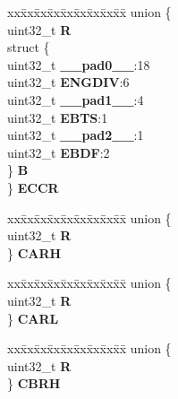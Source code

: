 \begin{DoxyCompactItemize}
\begin{tabbing}
\end{tabbing}\item 
\mbox{\label{structSIU__tag_ab62819545c38a07794ff44a516559b11}} 
\begin{tabbing}
xx\=xx\=xx\=xx\=xx\=xx\=xx\=xx\=xx\=\kill
union \{\\
\>uint32\_t {\bfseries R}\\
\>struct \{\\
\>\>uint32\_t {\bfseries \_\_pad0\_\_}:18\\
\>\>uint32\_t {\bfseries ENGDIV}:6\\
\>\>uint32\_t {\bfseries \_\_pad1\_\_}:4\\
\>\>uint32\_t {\bfseries EBTS}:1\\
\>\>uint32\_t {\bfseries \_\_pad2\_\_}:1\\
\>\>uint32\_t {\bfseries EBDF}:2\\
\>\} {\bfseries B}\\
\} {\bfseries ECCR}\\

\end{tabbing}\item 
\mbox{\label{structSIU__tag_a64fcdd83ff9c5bfd1331085664179384}} 
\begin{tabbing}
xx\=xx\=xx\=xx\=xx\=xx\=xx\=xx\=xx\=\kill
union \{\\
\>uint32\_t {\bfseries R}\\
\} {\bfseries CARH}\\

\end{tabbing}\item 
\mbox{\label{structSIU__tag_acd38a55ebe96d07c4ccf4faa7d1f1c1f}} 
\begin{tabbing}
xx\=xx\=xx\=xx\=xx\=xx\=xx\=xx\=xx\=\kill
union \{\\
\>uint32\_t {\bfseries R}\\
\} {\bfseries CARL}\\

\end{tabbing}\item 
\mbox{\label{structSIU__tag_a50910e169dfd0921d905750e7b799f0e}} 
\begin{tabbing}
xx\=xx\=xx\=xx\=xx\=xx\=xx\=xx\=xx\=\kill
union \{\\
\>uint32\_t {\bfseries R}\\
\} {\bfseries CBRH}\\


\end{tabbing}
\end{DoxyCompactItemize}
